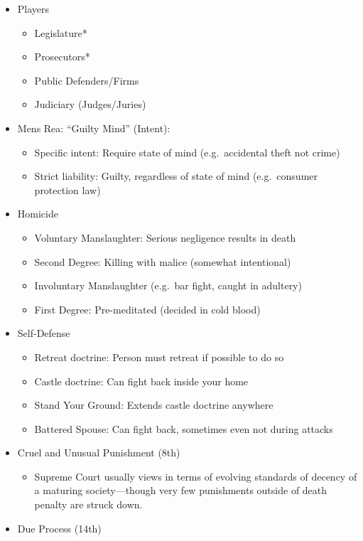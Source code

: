 \documentclass[
]{article}
\providecommand{\tightlist}{%
  \setlength{\itemsep}{0pt}\setlength{\parskip}{0pt}}
\begin{document}
\begin{itemize}
\item
  Players

  \begin{itemize}
  \item
    Legislature*
  \item
    Prosecutors*
  \item
    Public Defenders/Firms
  \item
    Judiciary (Judges/Juries)
  \end{itemize}
\item
  Mens Rea: ``Guilty Mind'' (Intent):

  \begin{itemize}
  \item
    Specific intent: Require state of mind (e.g.~accidental theft not
    crime)
  \item
    Strict liability: Guilty, regardless of state of mind (e.g.~consumer
    protection law)
  \end{itemize}
\item
  Homicide

  \begin{itemize}
  \item
    Voluntary Manslaughter: Serious negligence results in death
  \item
    Second Degree: Killing with malice (somewhat intentional)
  \item
    Involuntary Manslaughter (e.g.~bar fight, caught in adultery)
  \item
    First Degree: Pre-meditated (decided in cold blood)
  \end{itemize}
\item
  Self-Defense

  \begin{itemize}
  \item
    Retreat doctrine: Person must retreat if possible to do so
  \item
    Castle doctrine: Can fight back inside your home
  \item
    Stand Your Ground: Extends castle doctrine anywhere
  \item
    Battered Spouse: Can fight back, sometimes even not during attacks
  \end{itemize}
\item
  Cruel and Unusual Punishment (8th)

  \begin{itemize}
  \tightlist
  \item
    Supreme Court usually views in terms of evolving standards of
    decency of a maturing society---though very few punishments outside
    of death penalty are struck down.
  \end{itemize}
\item
  Due Process (14th)


\end{itemize}
\end{document}
